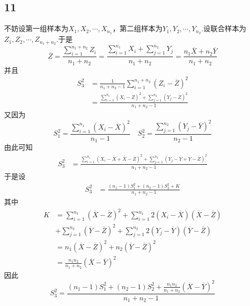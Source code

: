 \documentclass[twocolumn]{article}
\begin{document}
\begin{CJK}{UTF8}{gbsn}
			\section*{11}
				不妨设第一组样本为$X_1,X_2,\cdots,X_{n_1}$，第二组样本为$Y_1,Y_2,\cdots,Y_{n_2}$.设联合样本为$Z_1,Z_2,\cdots,Z_{n_1+n_2}$.于是\[\overline{Z}=\frac{\sum_{i=1}^{n_1+n_2}Z_i}{n_1+n_2}=\frac{\sum_{i=1}^{n_1}X_i+\sum_{j=1}^{n_2}Y_j}{n_1+n_2}=\frac{n_1\overline{X}+n_2\overline{Y}}{n_1+n_2}\]并且\begin{align*}
					S_3^2 & = \frac{1}{n_1+n_2-1}\sum_{i=1}^{n_1+n_2}(Z_i-\overline{Z})^2\\
					& = \frac{\sum_{i=1}^{n_1}(X_i-\overline{Z})^2+\sum_{j=1}^{n_2}(Y_j-\overline{Z})^2}{n_1+n_2-1}
 				\end{align*}
 				又因为\[S_1^2=\frac{\sum_{i=1}^{n_1}(X_i-\overline{X})^2}{n_1-1}\quad S_2^2=\frac{\sum_{j=1}^{n_2}(Y_j-\overline{Y})^2}{n_2-1}\]
				由此可知\begin{align*}
					S_3^2 & = \frac{\sum_{i=1}^{n_1}(X_i-\overline{X}+\overline{X}-\overline{Z})^2+\sum_{j=1}^{n_2}(Y_j-\overline{Y}+\overline{Y}-\overline{Z})^2}{n_1+n_2-1}
				\end{align*}
				于是设\begin{align*}
					S_3^2 & = \frac{(n_1-1)S_1^2+(n_2-1)S_2^2+K}{n_1+n_2-1}
				\end{align*}
				其中\begin{align*}
					K & = \sum_{i=1}^{n_1}(\overline{X}-\overline{Z})^2+\sum_{i=1}^{n_1}2(X_i-\overline{X})(\overline{X}-\overline{Z})\\
					& +\sum_{j=1}^{n_2}(\overline{Y}-\overline{Z})^2+\sum_{j=1}^{n_2}2(Y_j-\overline{Y})(\overline{Y}-\overline{Z})\\
					& = n_1(\overline{X}-\overline{Z})^2+n_2(\overline{Y}-\overline{Z})^2\\
					& = \frac{n_1n_2}{n_1+n_2}(\overline{X}-\overline{Y})^2
				\end{align*}
				因此\[S_3^2=\frac{(n_1-1)S_1^2+(n_2-1)S_2^2+\frac{n_1n_2}{n_1+n_2}(\overline{X}-\overline{Y})^2}{n_1+n_2-1}\]
	\end{CJK}
\end{document}
